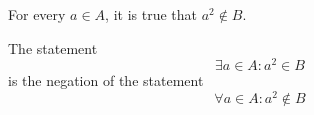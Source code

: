 \documentclass[main.tex]{subfiles}
\begin{document}
\subproblem{}\label{4c}
For every \(a \in A\), it is true that \(a^2 \notin B\).

\begin{remark}
	The statement
	\[\exists a \in A: a^2 \in B\]
	is the negation of the statement
	\[\forall a \in A: a^2 \notin B\]
\end{remark}
\end{document}
